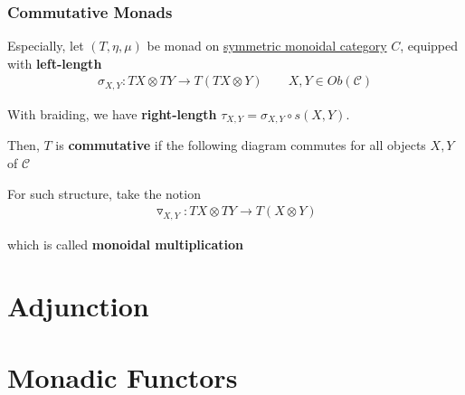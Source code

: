 \documentclass[Total.tex]{subfiles}
\begin{document}
			\subsubsection{Commutative Monads}
				\begin{Def}
					Especially, let $(T,\eta,\mu)$ be monad on \underline{symmetric monoidal category} $C$, equipped with \textbf{left-length} 
					\begin{gather*}
						\sigma_{X,Y}:TX\otimes TY\rightarrow T(TX\otimes Y)\qquad X,Y\in Ob(\mathcal{C})
					\end{gather*}
					
					With braiding, we have \textbf{right-length} $\tau_{X,Y}=\sigma_{X,Y}\circ s(X,Y)$. 
					
					Then, $T$ is \textbf{commutative} if the following diagram commutes for all objects $X,Y$ of $\mathcal{C}$
					\begin{center}
					\end{center}
				\end{Def}
				
				\begin{Def}
					For such structure, take the notion
					\begin{gather*}
						\triangledown_{X,Y}:TX\otimes TY\rightarrow T(X\otimes Y)
					\end{gather*}
					
					which is called \textbf{monoidal multiplication}
				\end{Def}
		\section{Adjunction}
		\section{Monadic Functors}
		
\end{document}
